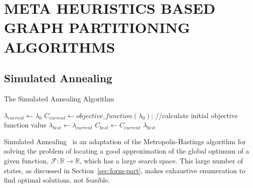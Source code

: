 \section{META HEURISTICS BASED GRAPH PARTITIONING ALGORITHMS}
\label{sec:meta}

\subsection{Simulated Annealing}
\label{sec:simu-anne}

\begin{algorithm}[ht!]
    \caption{The Simulated Annealing Algorithm}
    \label{algo:SA}
    $\lambda_{current} \leftarrow \lambda_0$ \;
    $C_{current} \leftarrow objective\_function(\lambda_0)$;  //calculate initial objective function value\;
    $\lambda_{best} \leftarrow \lambda_{current}$\;
    $C_{best} \leftarrow C_{current}$\;
    \Return $\lambda_{best}$
\end{algorithm}

Simulated Annealing~\cite{kirkpatrick1983optimization} is an adaptation of the Metropolis-Hastings algorithm for solving the problem of locating a good approximation of the global optimum of a given
function, $\mathcal{F}: \mathbb{R} \rightarrow \mathbb{R}$, which has a
large search space. This large number of states, as discussed in Section~\ref{sec:form-part}, makes exhaustive enumeration to find optimal solutions, not feasible.

